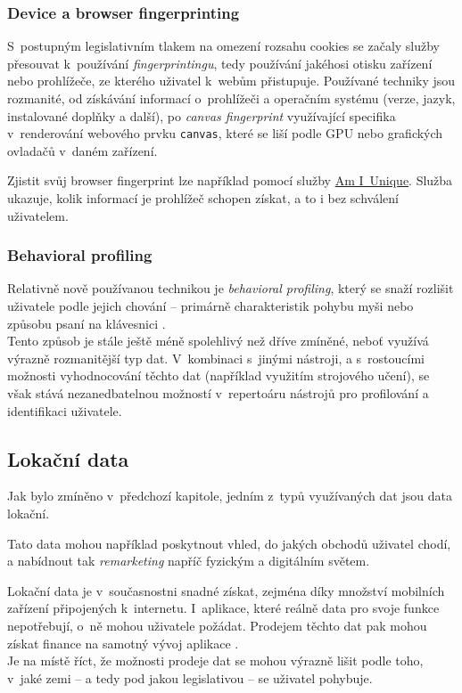 \subsubsection*{Device a browser fingerprinting}
S~postupným legislativním tlakem na omezení rozsahu cookies se začaly služby přesouvat k~používání \textit{fingerprintingu}, tedy používání jakéhosi otisku zařízení nebo prohlížeče, ze kterého uživatel k~webům přistupuje. Používané techniky jsou rozmanité, od získávání informací o~prohlížeči a operačním systému (verze, jazyk, instalované doplňky a další), po \textit{canvas fingerprint} využívající specifika v~renderování webového prvku \verb|canvas|, které se liší podle GPU nebo grafických ovladačů v~daném zařízení.  

Zjistit svůj browser fingerprint lze například pomocí služby \href{https://amiunique.org/fp}{Am I~Unique}. Služba ukazuje, kolik informací je prohlížeč schopen získat, a to i bez schválení uživatelem.

\subsubsection*{Behavioral profiling}
Relativně nově používanou technikou je \textit{behavioral profiling}, který se snaží rozlišit uživatele podle jejich chování -- primárně charakteristik pohybu myši nebo způsobu psaní na klávesnici \citep{behavioral-profiling, mouse-behavioral-biometrics, digital-behavior-fingerprint}.\\
Tento způsob je stále ještě méně spolehlivý než dříve zmíněné, neboť využívá výrazně rozmanitější typ dat.
V~kombinaci s~jinými nástroji, a s~rostoucími možnosti vyhodnocování těchto dat (například využitím strojového učení), se však stává nezanedbatelnou možností v~repertoáru nástrojů pro profilování a identifikaci uživatele.

\subsection{Lokační data}
Jak bylo zmíněno v~předchozí kapitole, jedním z~typů využívaných dat jsou data lokační.

Tato data mohou například poskytnout vhled, do jakých obchodů uživatel chodí, a nabídnout tak \textit{remarketing} napříč fyzickým a digitálním světem.

Lokační data je v~současnostni snadné získat, zejména díky množství mobilních zařízení připojených k~internetu. I~aplikace, které reálně data pro svoje funkce nepotřebují, o~ně mohou uživatele požádat. Prodejem těchto dat pak mohou získat finance na samotný vývoj aplikace .\\
Je na místě říct, že možnosti prodeje dat se mohou výrazně lišit podle toho, v~jaké zemi -- a tedy pod jakou legislativou -- se uživatel pohybuje.

